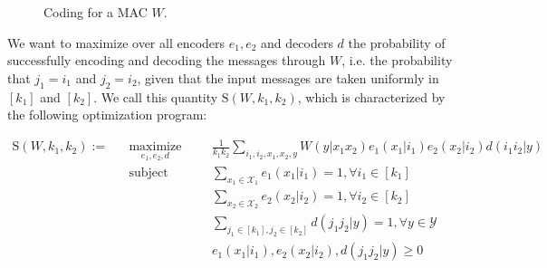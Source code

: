 \documentclass[11pt]{article}
\theoremstyle{definition}
\theoremstyle{remark}
\DeclareMathOperator{\maxi}{\text{maximize}}
\DeclareMathOperator{\st}{\text{subject to}}
\begin{document}
\begin{figure}[!h]
\begin{center}
\end{center}
\label{fig:MACcoding}
\caption{Coding for a MAC $W$.}
\end{figure}

We want to maximize over all encoders $e_1,e_2$ and decoders $d$ the probability of successfully encoding and decoding the messages through $W$, i.e. the probability that $j_1 = i_1$ and  $j_2 = i_2$, given that the input messages are taken uniformly in $[k_1]$ and $[k_2]$. We call this quantity $\mathrm{S}(W,k_1,k_2)$, which is characterized by the following optimization program:

\begin{equation}
\label{eq:def-succ-prob-mac}
  \begin{aligned}
    \mathrm{S}(W,k_1,k_2) := &&\underset{e_1,e_2,d}{\maxi} &&& \frac{1}{k_1k_2} \sum_{i_1,i_2,x_1,x_2,y} W(y|x_1x_2)e_1(x_1|i_1)e_2(x_2|i_2)d(i_1i_2|y)\\
    &&\st &&& \sum_{x_1 \in \mathcal{X}_1} e_1(x_1|i_1) = 1, \forall i_1 \in [k_1]\\
    &&&&&  \sum_{x_2 \in \mathcal{X}_2} e_2(x_2|i_2) = 1, \forall i_2 \in [k_2]\\
    &&&&& \sum_{j_1 \in [k_1],j_2 \in [k_2]} d(j_1j_2|y) = 1, \forall y \in \mathcal{Y}\\
    &&&&& e_1(x_1|i_1), e_2(x_2|i_2), d(j_1j_2|y) \geq 0
  \end{aligned}
\end{equation}
\end{document}
